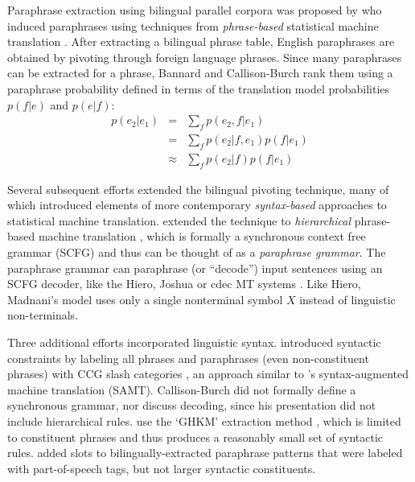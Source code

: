 \documentclass[11pt]{article}
\begin{document}
Paraphrase extraction using bilingual parallel corpora was proposed by
 who induced paraphrases using techniques
from {\it phrase-based} statistical machine translation
\cite{Koehn2003}. After extracting a bilingual phrase table, English
paraphrases are obtained by pivoting through foreign language
phrases.
Since many paraphrases can be extracted for a phrase, Bannard and
Callison-Burch rank them using a paraphrase probability defined in
terms of the translation model probabilities $p(f | e)$ and $p(e |
f)$: \nocite{Callison-Burch2005}
\begin{eqnarray}
  p(e_2|e_1) &=& \sum_f p(e_2,f|e_1)\\
                  &=& \sum_f p(e_2|f,e_1) p(f|e_1) \\
                  &\approx& \sum_f p(e_2|f) p(f|e_1)
\label{paraphrase_prob_eqn}
\end{eqnarray}

Several subsequent efforts extended the bilingual pivoting technique,
many of which introduced elements of more contemporary {\it
  syntax-based} approaches to statistical machine translation.
 extended the technique to {\it hierarchical}
phrase-based machine translation \cite{Chiang2005}, which is formally
a synchronous context free grammar (SCFG) and thus can be thought of
as a {\it paraphrase grammar}. The paraphrase grammar can paraphrase
(or ``decode'') input sentences using an SCFG decoder, like the Hiero,
Joshua or cdec MT systems \cite{Chiang2007,Joshua-WMT,Dyer_etal_2010}.
Like Hiero, Madnani's model uses only a single nonterminal symbol
$X$ instead of linguistic non-terminals.


Three additional efforts incorporated linguistic
syntax.  introduced syntactic constraints
by labeling all phrases and paraphrases (even non-constituent phrases)
with CCG slash categories \cite{Steedman1999}, an approach similar to
's syntax-augmented machine translation
(SAMT). Callison-Burch did not formally define a synchronous grammar,
nor discuss decoding, since his presentation did not include
hierarchical rules.   use the `GHKM'
extraction method \cite{Galley2004}, which is limited to constituent
phrases and thus produces a reasonably small set of syntactic rules.
 added slots to bilingually-extracted paraphrase
patterns that were labeled with part-of-speech tags, but not larger
syntactic constituents.
\end{document}
